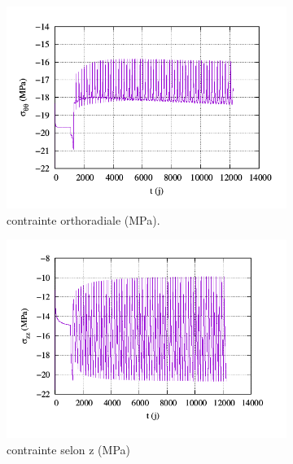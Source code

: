 \documentclass[11pt,french,a4paper]{article}
\begin{document}
\begin{figure}[h!]
\centering

\begin{subfigure}[b]{0.3\linewidth}
    \includegraphics[width=\linewidth]{image/chap2/STT1.png}
    \caption{contrainte orthoradiale (MPa).}
\end{subfigure}
\hspace{0.1cm}
\begin{subfigure}[b]{0.3\linewidth}
    \includegraphics[width=\linewidth]{image/chap2/SZZ1.png}
    \caption{contrainte selon z (MPa)}
\end{subfigure}
\hspace{0.1cm}
\begin{subfigure}[b]{0.3\linewidth}

\end{subfigure}
\end{figure}
\end{document}
